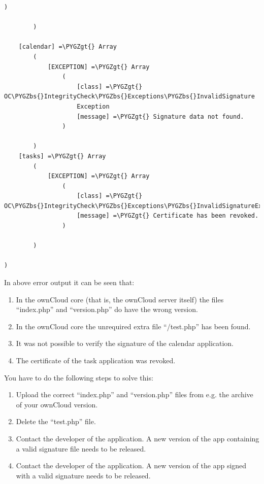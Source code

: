 \documentclass[letterpaper,10pt,english]{sphinxmanual}
\def\PYGZbs{\char`\\}
\def\PYGZgt{\char`\>}
\begin{document}
\begin{Verbatim}[commandchars=\\\{\}]
                )

        )

    [calendar] =\PYGZgt{} Array
        (
            [EXCEPTION] =\PYGZgt{} Array
                (
                    [class] =\PYGZgt{} OC\PYGZbs{}IntegrityCheck\PYGZbs{}Exceptions\PYGZbs{}InvalidSignature
                    Exception
                    [message] =\PYGZgt{} Signature data not found.
                )

        )
    [tasks] =\PYGZgt{} Array
        (
            [EXCEPTION] =\PYGZgt{} Array
                (
                    [class] =\PYGZgt{} OC\PYGZbs{}IntegrityCheck\PYGZbs{}Exceptions\PYGZbs{}InvalidSignatureException
                    [message] =\PYGZgt{} Certificate has been revoked.
                )

        )

)
\end{Verbatim}

In above error output it can be seen that:
\begin{enumerate}
\item {} 
In the ownCloud core (that is, the ownCloud server itself) the files
``index.php'' and ``version.php'' do have the wrong version.

\item {} 
In the ownCloud core the unrequired extra file ``/test.php'' has been found.

\item {} 
It was not possible to verify the signature of the calendar application.

\item {} 
The certificate of the task application was revoked.

\end{enumerate}

You have to do the following steps to solve this:
\begin{enumerate}
\item {} 
Upload the correct ``index.php'' and ``version.php'' files from e.g. the archive of your ownCloud version.

\item {} 
Delete the ``test.php'' file.

\item {} 
Contact the developer of the application. A new version of the app containing a valid signature file needs to be released.

\item {} 
Contact the developer of the application. A new version of the app signed with a valid signature needs to be released.

\end{enumerate}
\end{document}
